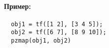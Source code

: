 \paragraph{Пример:}
\begin{verbatim}
  obj1 = tf([1 2], [3 4 5]);
  obj2 = tf([6 7], [8 9 10]);
  pzmap(obj1, obj2)
\end{verbatim}
